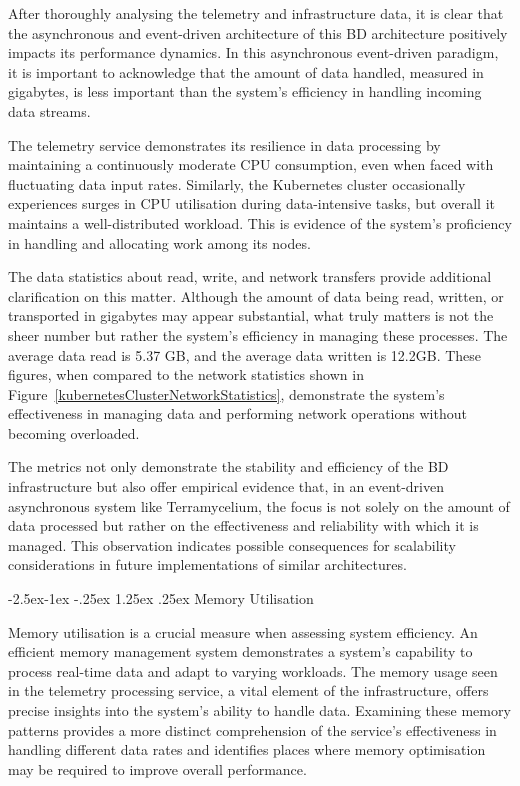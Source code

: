 \documentclass[preprint,12pt]{elsarticle}
\makeatletter
\renewcommand\paragraph{\@startsection{paragraph}{4}{\z@}%
            {-2.5ex\@plus -1ex \@minus -.25ex}%
            {1.25ex \@plus .25ex}%
            {\normalfont\normalsize\itshape}}
\makeatother
\begin{document}
After thoroughly analysing the telemetry and infrastructure data, it is clear that the asynchronous and event-driven architecture of this BD architecture positively impacts its performance dynamics. In this asynchronous event-driven paradigm, it is important to acknowledge that the amount of data handled, measured in gigabytes, is less important than the system's efficiency in handling incoming data streams.

The telemetry service demonstrates its resilience in data processing by maintaining a continuously moderate CPU consumption, even when faced with fluctuating data input rates. Similarly, the Kubernetes cluster occasionally experiences surges in CPU utilisation during data-intensive tasks, but overall it maintains a well-distributed workload. This is evidence of the system's proficiency in handling and allocating work among its nodes.

The data statistics about read, write, and network transfers provide additional clarification on this matter. Although the amount of data being read, written, or transported in gigabytes may appear substantial, what truly matters is not the sheer number but rather the system's efficiency in managing these processes. The average data read is 5.37 GB, and the average data written is 12.2GB. These figures, when compared to the network statistics shown in Figure~\ref{kubernetesClusterNetworkStatistics}, demonstrate the system's effectiveness in managing data and performing network operations without becoming overloaded.

The metrics not only demonstrate the stability and efficiency of the BD infrastructure but also offer empirical evidence that, in an event-driven asynchronous system like Terramycelium, the focus is not solely on the amount of data processed but rather on the effectiveness and reliability with which it is managed. This observation indicates possible consequences for scalability considerations in future implementations of similar architectures.

\paragraph{Memory Utilisation}

Memory utilisation is a crucial measure when assessing system efficiency. An efficient memory management system demonstrates a system's capability to process real-time data and adapt to varying workloads. The memory usage seen in the telemetry processing service, a vital element of the infrastructure, offers precise insights into the system's ability to handle data. Examining these memory patterns provides a more distinct comprehension of the service's effectiveness in handling different data rates and identifies places where memory optimisation may be required to improve overall performance.
\end{document}
